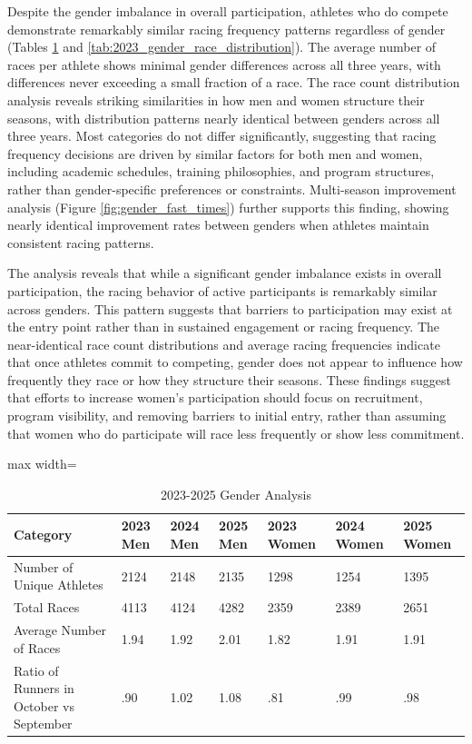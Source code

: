 \documentclass[suppldata]{interact}
\theoremstyle{plain}%
\theoremstyle{definition}
\theoremstyle{remark}
\begin{document}
Despite the gender imbalance in overall participation, athletes who do compete demonstrate remarkably similar racing frequency patterns regardless of gender (Tables \ref{tab:total_unique_results} and \ref{tab:2023_gender_race_distribution}). The average number of races per athlete shows minimal gender differences across all three years, with differences never exceeding a small fraction of a race. The race count distribution analysis reveals striking similarities in how men and women structure their seasons, with distribution patterns nearly identical between genders across all three years. Most categories do not differ significantly, suggesting that racing frequency decisions are driven by similar factors for both men and women, including academic schedules, training philosophies, and program structures, rather than gender-specific preferences or constraints. Multi-season improvement analysis (Figure \ref{fig:gender_fast_times}) further supports this finding, showing nearly identical improvement rates between genders when athletes maintain consistent racing patterns.

The analysis reveals that while a significant gender imbalance exists in overall participation, the racing behavior of active participants is remarkably similar across genders. This pattern suggests that barriers to participation may exist at the entry point rather than in sustained engagement or racing frequency. The near-identical race count distributions and average racing frequencies indicate that once athletes commit to competing, gender does not appear to influence how frequently they race or how they structure their seasons. These findings suggest that efforts to increase women's participation should focus on recruitment, program visibility, and removing barriers to initial entry, rather than assuming that women who do participate will race less frequently or show less commitment.



\begin{table}[ht]
    \centering
    \begin{adjustbox}{max width=\linewidth}
    \begin{tabular}{|@{}l|l@{}|l|l|l|l|l|}
        \hline
        \textbf {Category} & \textbf{2023 Men}& \textbf{2024 Men}& \textbf{2025 Men}& \textbf{2023 Women}& \textbf{2024 Women}&\textbf{2025 Women}\\ \hline
        Number of Unique Athletes & 2124 & 2148 & 2135& 1298  & 1254 &1395\\ \hline
        Total Races & 4113 & 4124 & 4282& 2359  & 2389 &2651\\ \hline
        Average Number of Races & 1.94 & 1.92 & 2.01& 1.82  & 1.91 &1.91 \\ \hline
        Ratio of Runners in October vs September & .90 & 1.02 & 1.08& .81  & .99 &.98\\ \hline
    \end{tabular}
    \end{adjustbox}
    \caption{2023-2025 Gender Analysis}
    \label{tab:total_unique_results}
\end{table}
\end{document}
